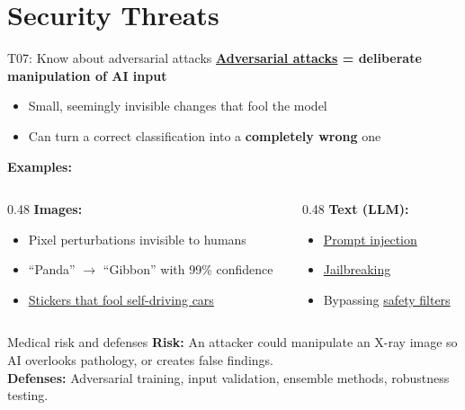 \documentclass[aspectratio=169, 10pt]{beamer}
\begin{document}
\section{Security Threats}

\begin{frame}{T07: Know about adversarial attacks}
    \textbf{\href{https://en.wikipedia.org/wiki/Adversarial_machine_learning}{Adversarial attacks} = deliberate manipulation of AI input}
    
    \begin{itemize}
        \item Small, seemingly invisible changes that fool the model
        \item Can turn a correct classification into a \textbf{completely wrong} one
    \end{itemize}
    
    \vspace{0.2cm}
    \textbf{Examples:}
    \begin{columns}[T]
        \begin{column}{0.48\textwidth}
            \textbf{Images:}
            \begin{itemize}
                \item Pixel perturbations invisible to humans
                \item ``Panda'' $\rightarrow$ ``Gibbon'' with 99\% confidence
                \item \href{https://arxiv.org/abs/1707.08945}{Stickers that fool self-driving cars}
            \end{itemize}
        \end{column}
        \begin{column}{0.48\textwidth}
            \textbf{Text (LLM):}
            \begin{itemize}
                \item \href{https://en.wikipedia.org/wiki/Prompt_injection}{Prompt injection}
                \item \href{https://en.wikipedia.org/wiki/Jailbreaking_(LLM)}{Jailbreaking}
                \item Bypassing \href{https://en.wikipedia.org/wiki/Content_moderation}{safety filters}
            \end{itemize}
        \end{column}
    \end{columns}
    
    \vspace{0.15cm}
    {\small
    \begin{alertblock}{Medical risk and defenses}
        \textbf{Risk:} An attacker could manipulate an X-ray image so AI overlooks pathology, or creates false findings. \\
        \textbf{Defenses:} Adversarial training, input validation, ensemble methods, robustness testing.
    \end{alertblock}
    }
\end{frame}
\end{document}
